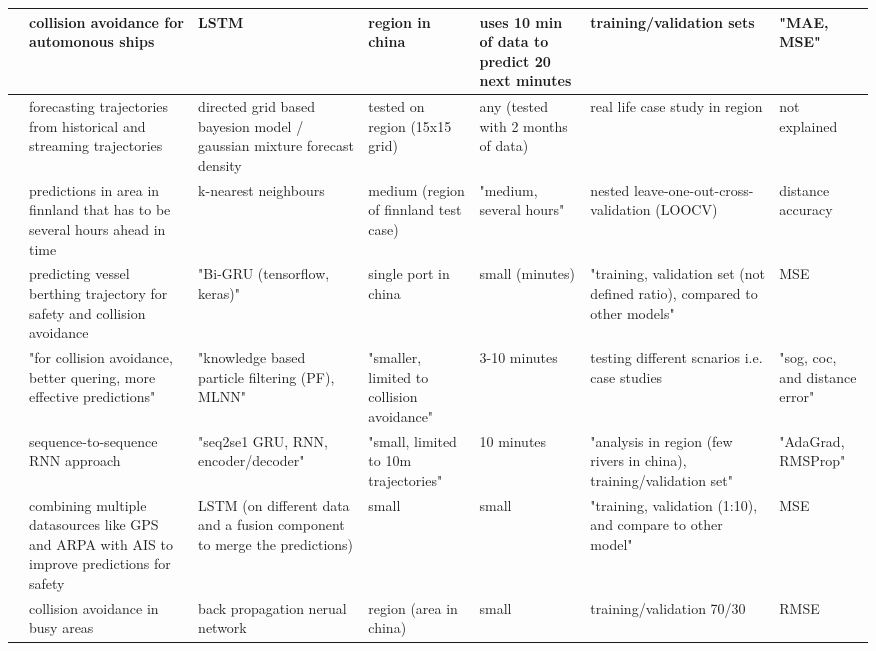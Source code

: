 \begin{sidewaystable}
{\begin{tabular}{|l|l|l|l|l|l|l|}
        \cite{Tang2019ANetwork} & collision avoidance for automonous ships & LSTM & region in china & uses 10 min of data to predict 20 next minutes & training/validation sets & "MAE, MSE" \\ \hline
        \cite{Uney2019DataModels} & forecasting trajectories from historical and streaming trajectories & directed grid based bayesion model / gaussian mixture forecast density & tested on region (15x15 grid) & any (tested with 2 months of data) & real life case study in region & not explained \\ \hline
        \cite{Virjonen2018ShipMethod} & predictions in area in finnland that has to be several hours ahead in time & k-nearest neighbours & medium (region of finnland test case) & "medium, several hours" & nested leave-one-out-cross-validation (LOOCV) & distance accuracy \\ \hline
        \cite{Wang2020VesselGRU} & predicting vessel berthing trajectory for safety and collision avoidance & "Bi-GRU (tensorflow, keras)" & single port in china & small (minutes) & "training, validation set (not defined ratio), compared to other models" & MSE \\ \hline
        \cite{Xiao2020BigTechniques} & "for collision avoidance, better quering, more effective predictions" & "knowledge based particle filtering (PF), MLNN" & "smaller, limited to collision avoidance" & 3-10 minutes & testing different scnarios i.e. case studies & "sog, coc, and distance error" \\ \hline
        \cite{You2020ST-Seq2Seq:Prediction} & sequence-to-sequence RNN approach & "seq2se1 GRU, RNN, encoder/decoder" & "small, limited to 10m trajectories" & 10 minutes & "analysis in region (few rivers in china), training/validation set" & "AdaGrad, RMSProp" \\ \hline
        \cite{Zheng2020HeterogenousModeling} & combining multiple datasources like GPS and ARPA with AIS to improve predictions for safety & LSTM (on different data and a fusion component to merge the predictions) & small & small & "training, validation (1:10), and compare to other model" & MSE \\ \hline
        \cite{Zhou2019ShipNetwork} & collision avoidance in busy areas & back propagation nerual network & region (area in china) & small & training/validation 70/30 & RMSE \\ \hline
    \end{tabular}
    }
\end{sidewaystable}
